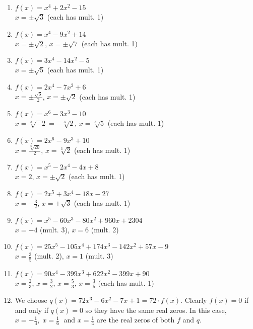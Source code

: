 \begin{enumerate}
\item $f(x) = x^4+2x^2 - 15$ \\ $x = \pm \sqrt{3}$ (each has mult. 1)
\item $f(x) = x^4-9x^2+14$ \\ $x = \pm \sqrt{2}$, $x = \pm \sqrt{7}$ (each has mult. 1)

\item $f(x) = 3x^4-14x^2-5$ \\ $x = \pm \sqrt{5}$ (each has mult. 1)
\item $f(x) = 2x^4-7x^2+6$ \\  $x = \pm \frac{\sqrt{6}}{2}$, $x = \pm \sqrt{2}$ (each has mult. 1)

\item $f(x) = x^6-3x^3-10$ \\ $x = \sqrt[3]{-2} = -\sqrt[3]{2}$, $x = \sqrt[3]{5}$ (each has mult. 1)
\item $f(x) = 2x^6-9x^3+10$ \\ $x =\frac{\sqrt[3]{20}}{2} $, $x = \sqrt[3]{2}$ (each has mult. 1)


\item $f(x) = x^5-2x^4-4x+8$ \\ $x = 2$, $x = \pm \sqrt{2}$ (each has mult. 1)
\item $f(x) = 2x^5+3x^4-18x-27$ \\ $x = -\frac{3}{2}$, $x = \pm \sqrt{3}$ (each has mult. 1)

\item $f(x) = x^{5} - 60x^{3} - 80x^{2} + 960x + 2304 $ \\ $x = -4$ (mult. 3), $x = 6$ (mult. 2)


\item $f(x) = 25x^{5} - 105x^{4} + 174x^{3} - 142x^{2} + 57x - 9$ \\ $x = \frac{3}{5}$ (mult. 2), $x = 1$ (mult. 3)

\item $f(x) = 90x^{4} - 399x^{3} + 622x^{2} - 399x + 90$ \\ $x = \frac{2}{3}$, $x = \frac{3}{2}$, $x = \frac{5}{3}$, $x = \frac{3}{5}$ (each has mult. 1)


\item We choose $q(x) = 72x^{3} - 6x^{2} - 7x + 1 = 72 \cdot f(x)$.  Clearly $f(x) = 0$ if and only if $q(x) = 0$ so they have the same real zeros.  In this case, $x = -\frac{1}{3}, \; x = \frac{1}{6} \;$ and $x = \frac{1}{4}$ are the real zeros of both $f$ and $q$.


\setcounter{HW}{\value{enumi}}
\end{enumerate}



